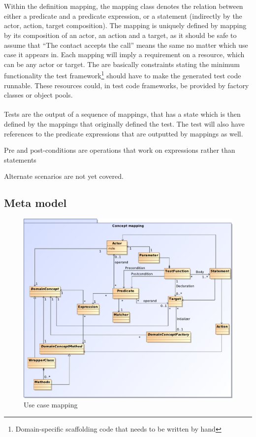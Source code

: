 \\\\
Within the definition mapping, the mapping class denotes the relation between either a predicate and a predicate expression, or a statement (indirectly by the actor, action, target composition). The mapping is uniquely defined by mapping by its composition of an actor, an action and a target, as it should be safe to assume that ``The contact accepts the call'' means the same no matter which use case it appears in. Each mapping will imply a requirement on a resource, which can be any actor or target. The are basically constraints stating the minimum functionality the test framework\footnote{Domain-specific scaffolding code that needs to be written by hand} should have to make the generated test code runnable. These resources could, in test code frameworks, be provided by factory classes or object pools.\\\\
Tests are the output of a sequence of mappings, that has a state which is then defined by the mappings that originally defined the test. The test will also have references to the predicate expressions that are outputted by mappings as well.



Pre and post-conditions are operations that work on expressions rather than statements

Alternate scenarios are not yet covered.

\subsection{Meta model}

\begin{figure}[h]
  \centering
 
  \includegraphics[scale=0.72]{img/use_case_mapping}
  \caption{Use case mapping}
  \label{fig:use_case_mapping}
\end{figure}

